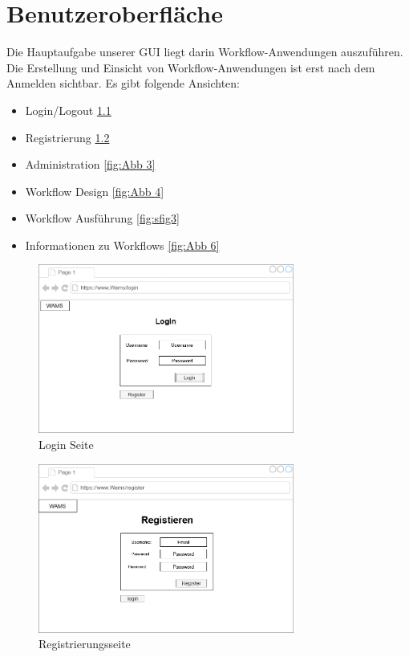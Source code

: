 \chapter{Benutzeroberfläche}
    Die Hauptaufgabe unserer \gls{GUI} liegt darin Workflow-Anwendungen auszuführen. Die Erstellung und Einsicht von Workflow-Anwendungen ist erst nach dem Anmelden sichtbar. Es gibt folgende Ansichten:
    \begin{itemize}
        \item Login/Logout \ref{fig:Abb 1}
        \item Registrierung \ref{fig:Abb 2}
        \item Administration \ref{fig:Abb 3}
        \item Workflow Design \ref{fig:Abb 4}
        \item Workflow Ausführung \ref{fig:sfig3}
        \item Informationen zu Workflows \ref{fig:Abb 6}
    \end{itemize}

\begin{figure}[ht]
    \centering
    \includegraphics[width = 0.75\textwidth]{Grafiken/Gui Mockups/loginGui.drawio.png}
    \caption{Login Seite}
    \label{fig:Abb 1}
\end{figure}

\begin{figure}[ht]
    \centering
    \includegraphics[width = 0.75\textwidth]{Grafiken/Gui Mockups/registrationGui.drawio.png}
    \caption{Registrierungsseite}
    \label{fig:Abb 2}
\end{figure}

